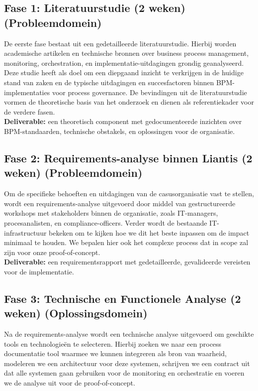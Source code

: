 \subsection{Fase 1: Literatuurstudie (2 weken) (Probleemdomein)}

De eerste fase bestaat uit een gedetailleerde literatuurstudie. Hierbij worden academische artikelen en technische bronnen over business process management, monitoring, orchestration, en implementatie-uitdagingen grondig geanalyseerd. Deze studie heeft als doel om een diepgaand inzicht te verkrijgen in de huidige stand van zaken en de typische uitdagingen en succesfactoren binnen BPM-implementaties voor process governance. De bevindingen uit de literatuurstudie vormen de theoretische basis van het onderzoek en dienen als referentiekader voor de verdere fasen. \\

\textbf{Deliverable:} een theoretisch component met gedocumenteerde inzichten over BPM-standaarden, technische obstakels, en oplossingen voor de organisatie.

\subsection{Fase 2: Requirements-analyse binnen Liantis (2 weken) (Probleemdomein)}

Om de specifieke behoeften en uitdagingen van de casusorganisatie vast te stellen, wordt een requirements-analyse uitgevoerd door middel van gestructureerde workshops met stakeholders binnen de organisatie, zoals IT-managers, procesanalisten, en compliance-officers. Verder wordt de bestaande IT-infrastructuur bekeken om te kijken hoe we dit het beste inpassen om de impact minimaal te houden. We bepalen hier ook het complexe process dat in scope zal zijn voor onze proof-of-concept. \\

\textbf{Deliverable:} een requirementsrapport met gedetailleerde, gevalideerde vereisten voor de implementatie.

\subsection{Fase 3: Technische en Functionele Analyse (2 weken) (Oplossingsdomein)}

Na de requirements-analyse wordt een technische analyse uitgevoerd om geschikte tools en technologieën te selecteren. Hierbij zoeken we naar een process documentatie tool waarmee we kunnen integreren als bron van waarheid, modeleren we een architectuur voor deze systemen, schrijven we een contract uit dat alle systemen gaan gebruiken voor de monitoring en orchestratie en voeren we de analyse uit voor de proof-of-concept.  \\

